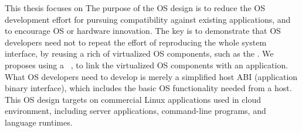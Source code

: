 This thesis focuses on 
The purpose of the OS design
is to reduce the OS development effort for pursuing compatibility
against existing applications,
and to encourage OS or hardware innovation.
The key is to demonstrate that OS developers need not to repeat the effort of reproducing the whole system interface,
by reusing a rich of virtualized OS components, such as the \linuxapis{}.
We proposes using a  \libos{}~\cite{porter11drawbridge,engler95exokernel,libra,unikernels},
to link the virtualized OS components
with an application.
What OS developers need to develop is merely a simplified host ABI (application binary interface),
which includes
the basic OS functionality needed from a host.
This OS design targets on commercial Linux applications used in cloud environment, including server applications, command-line programs, and language runtimes.


